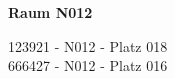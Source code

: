 \titleblock\begin{multicols}{3}\vspace{1em}\textbf{Raum N012}

123921 - N012 - Platz 018\\
666427 - N012 - Platz 016\\
\end{multicols}
